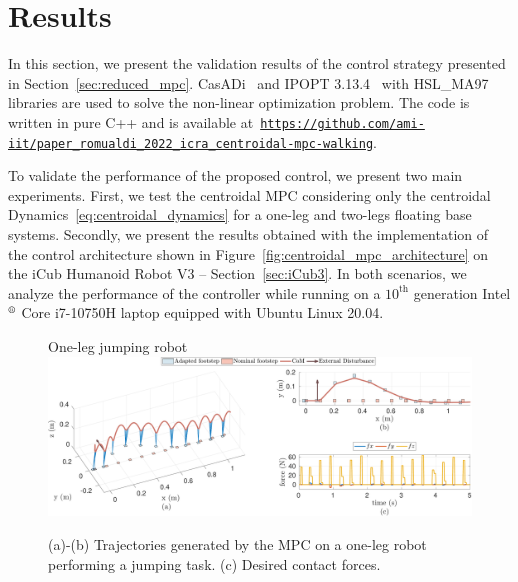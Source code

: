 




\section{Results}
\label{sec:centroidal_mpc_results}
In this section, we present the validation results of the control strategy presented in Section~\ref{sec:reduced_mpc}.
CasADi~\citep{Andersson2018CasADi:Control} and IPOPT 3.13.4~\citep{IPOpt2006} with HSL\_MA97~\citep{Hogg2011HSL_MA97Systems} libraries are used to solve the non-linear optimization problem. The code is written in pure C++ and is available at~\href{https://github.com/ami-iit/paper_romualdi_2022_icra_centroidal-mpc-walking}{\texttt{https://github.com/ami-iit/paper\_romualdi\_2022\_icra\_centroidal-mpc-walking}}.
\par
To validate the performance of the proposed control, we present two main experiments. First, we test the centroidal MPC considering only the centroidal Dynamics~\eqref{eq:centroidal_dynamics} for a one-leg and two-legs floating base systems. Secondly, we present the results obtained with the implementation of the control architecture shown in Figure~\ref{fig:centroidal_mpc_architecture} on the iCub Humanoid Robot V3 -- Section~\ref{sec:iCub3}. 
In both scenarios, we analyze the performance of the controller while running on a $10^\text{th}$ generation Intel$^\text{\textregistered}$ Core i7-10750H laptop equipped with Ubuntu Linux 20.04. 
\par
\begin{figure}[!t]
    \centering
    \begin{myframe}{One-leg jumping robot}
    \includegraphics[width=\textwidth]{chapter_centroidal_mpc/figures/jump_traj.pdf}
    \end{myframe}
    \caption{(a)-(b) Trajectories generated by the MPC on a one-leg robot performing a jumping task. (c) Desired contact forces.}
    \label{fig:one_leg_jumping}
\end{figure}
